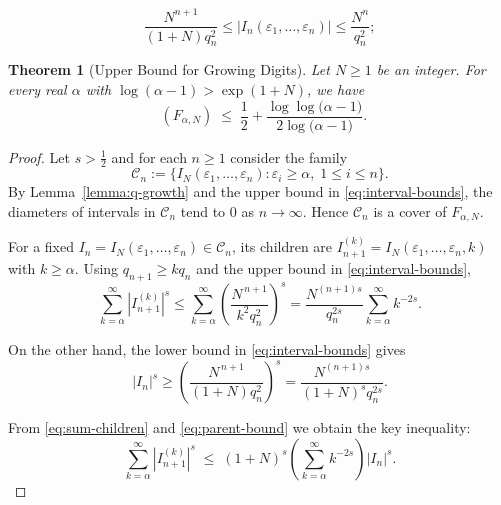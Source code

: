 \documentclass[10pt,a4paper]{amsart}
\newtheorem{theorem}{Theorem}
\newcommand{\I}{I_N}
\DeclareMathOperator{\dimH}{dim_H}
\begin{document}
\begin{equation}
\frac{N^{n+1}}{(1+N)q_n^2} \leq |I_n(\varepsilon_1, \ldots, \varepsilon_n)| \leq \frac{N^n}{q_n^2}; \label{eq:interval-bounds}
\end{equation}

\begin{theorem}[Upper Bound for Growing Digits] \label{upperbound:Good2N}
Let $N \geq 1$ be an integer. For every real $\alpha$ with $\log(\alpha-1) > \exp(1+N)$, we have
\begin{equation}\label{eq:upper-ineq}
\dimH(F_{\alpha,N}) 
\;\le\; 
\frac12 + \frac{\log\log\!\bigl({\alpha}-1\bigr)}{2\log\!\bigl({\alpha}-1\bigr)}.
\end{equation}
\end{theorem}

\begin{proof} 
Let $s > \tfrac12$ and for each $n \geq 1$ consider the family
\[
\mathcal{C}_n := \{ \I(\varepsilon_1, \dots, \varepsilon_n) : \varepsilon_i \geq \alpha,\; 1 \leq i \leq n \}.
\]
By Lemma~\ref{lemma:q-growth} and the upper bound in \eqref{eq:interval-bounds}, 
the diameters of intervals in $\mathcal{C}_n$ tend to $0$ as $n \to \infty$. Hence $\mathcal{C}_n$ is a cover of $F_{\alpha,N}$.

For a fixed $I_n = \I(\varepsilon_1,\dots,\varepsilon_n) \in \mathcal{C}_n$, its children are 
$I_{n+1}^{(k)} = \I(\varepsilon_1,\dots,\varepsilon_n,k)$ with $k \geq \alpha$. 
Using $q_{n+1} \geq k q_n$ and the upper bound in \eqref{eq:interval-bounds},
\begin{equation}
\sum_{k=\alpha}^{\infty} |I_{n+1}^{(k)}|^s 
   \leq \sum_{k=\alpha}^{\infty} \left( \frac{N^{\,n+1}}{k^2 q_n^{2}} \right)^s
   = \frac{N^{(n+1)s}}{q_n^{2s}} \sum_{k=\alpha}^{\infty} k^{-2s}.
\label{eq:sum-children}
\end{equation}

On the other hand, the lower bound in \eqref{eq:interval-bounds} gives
\begin{equation}\label{eq:parent-bound}
|I_n|^s \geq \left( \frac{N^{\,n+1}}{(1+N) q_n^{2}} \right)^s 
        = \frac{N^{(n+1)s}}{(1+N)^s q_n^{2s}}.
\end{equation}

From \eqref{eq:sum-children} and \eqref{eq:parent-bound} we obtain the key inequality:
\begin{equation}\label{eq:children-parent}
\sum_{k=\alpha}^{\infty} |I_{n+1}^{(k)}|^s 
\; \leq \; (1+N)^s \left( \sum_{k=\alpha}^{\infty} k^{-2s} \right) |I_n|^s .
\end{equation}


\end{proof}
\end{document}
